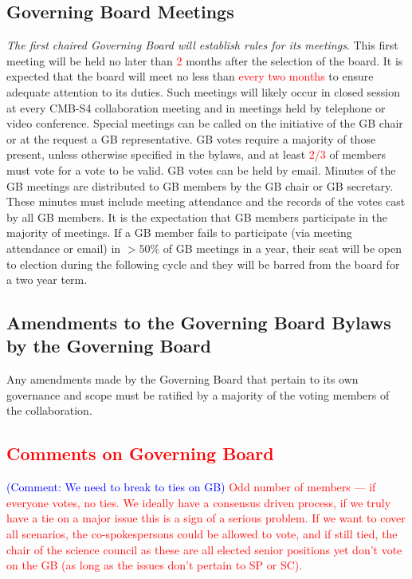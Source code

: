 \documentclass[12pt]{article}
\newcommand{\Comment}[1]{\textcolor{Blue}{(Comment: #1)}}
\begin{document}
\subsection{Governing Board Meetings}
\textit{The first chaired Governing Board will establish rules for its meetings}. This first meeting will be held no later than \textcolor{red}{2} months after the selection of the board.  It is expected that the board will meet no less than \textcolor{red}{every two months} to ensure adequate attention to its duties. Such meetings will likely occur in closed session at every CMB-S4 collaboration meeting and in meetings held by telephone or video conference. Special meetings can be called on the initiative of the GB chair or at the request a GB representative. GB votes require a majority of those present, unless otherwise specified in the bylaws, and at least \textcolor{red}{2/3} of members must vote for a vote to be valid. GB votes can be held by email. Minutes of the GB meetings are distributed to GB members by the GB chair or GB secretary. These minutes must include meeting attendance and the records of the votes cast by all GB members. It is the expectation that GB members participate in the majority of meetings. If a GB member fails to participate (via meeting attendance or email) in $>50\%$ of GB meetings in a year, their seat will be open to election during the following cycle and they will be barred from the board for a two year term.  %

\subsection{Amendments to the Governing Board Bylaws by the Governing Board} \label{subsec:amend}
Any amendments made by the Governing Board that pertain to its own governance and scope must be ratified by a majority of the voting members of the collaboration.


\subsection{\textcolor{red}{Comments on Governing Board}}

\Comment{We need to break to ties on GB}
\textcolor{red}{Odd number of members --- if everyone votes, no ties. We ideally have a consensus driven process, if we truly have a tie on a major issue this is a sign of a serious problem. If we want to cover all scenarios, the co-spokespersons could be allowed to vote, and if still tied, the chair of the science council as these are all elected senior positions yet don't vote on the GB (as long as the issues don't pertain to SP or SC).} 
\end{document}
